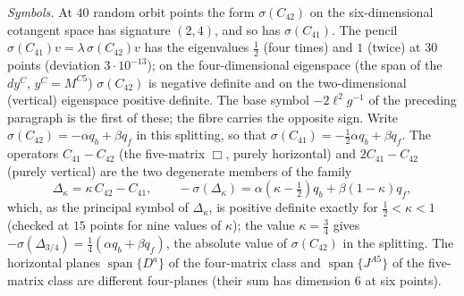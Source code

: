 \emph{Symbols.} At \(40\) random orbit points the form \(\sigma(C_{42})\) on the six-dimensional cotangent space has signature \((2,4)\), and so has \(\sigma(C_{41})\). The pencil \(\sigma(C_{41})v=\lambda\,\sigma(C_{42})v\) has the eigenvalues \(\tfrac12\) (four times) and \(1\) (twice) at \(30\) points (deviation \(3\cdot10^{-13}\)); on the four-dimensional eigenspace (the span of the \(dy^C\), \(y^C=M^{C5}\)) \(\sigma(C_{42})\) is negative definite and on the two-dimensional (vertical) eigenspace positive definite. The base symbol \(-2\ell^2g^{-1}\) of the preceding paragraph is the first of these; the fibre carries the opposite sign. Write \(\sigma(C_{42})=-\alpha q_b+\beta q_f\) in this splitting, so that \(\sigma(C_{41})=-\tfrac12\alpha q_b+\beta q_f\). The operators \(C_{41}-C_{42}\) (the five-matrix \(\Box\), purely horizontal) and \(2C_{41}-C_{42}\) (purely vertical) are the two degenerate members of the family
\[
\Delta_\kappa=\kappa\,C_{42}-C_{41},\qquad -\sigma(\Delta_\kappa)=\alpha(\kappa-\tfrac12)q_b+\beta(1-\kappa)q_f ,
\]
which, as the principal symbol of \(\Delta_\kappa\), is positive definite exactly for \(\tfrac12<\kappa<1\) (checked at \(15\) points for nine values of \(\kappa\)); the value \(\kappa=\tfrac34\) gives \(-\sigma(\Delta_{3/4})=\tfrac14(\alpha q_b+\beta q_f)\), the absolute value of \(\sigma(C_{42})\) in the splitting. The horizontal planes \(\operatorname{span}\{D^a\}\) of the four-matrix class and \(\operatorname{span}\{J^{A5}\}\) of the five-matrix class are different four-planes (their sum has dimension \(6\) at six points).

